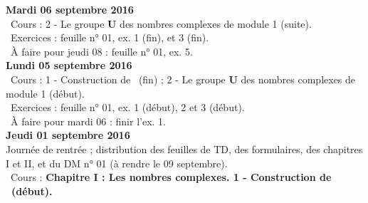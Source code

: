 \documentclass[12pt,a4paper]{article}
\begin{document}
\noindent\textbf{\bf Mardi 06 septembre 2016}\\
\bu\ Cours : 2 - Le groupe \textbf{U} des nombres complexes de 
module 1 (suite).\\
\bu\ Exercices : feuille n° 01, ex. 1 (fin), et 3 (fin).\\
\bu\ À faire pour jeudi 08 : feuille n° 01, ex. 5.\vspace{.4cm}\\

\noindent\textbf{\bf Lundi 05 septembre 2016}\\
\bu\ Cours : 1 - Construction de \C\ (fin) ; 2 - Le groupe \textbf{U} des nombres complexes de 
module 1 (début).\\
\bu\ Exercices : feuille n° 01, ex. 1 (début), 2 et 3 (début).\\
\bu\ À faire pour mardi 06 : finir l'ex. 1.\vspace{.4cm}\\

\noindent\textbf{\bf Jeudi 01 septembre 2016}\\
Journée de rentrée ; distribution des feuilles de TD, des formulaires, des
chapitres I et II, et du DM n° 01 (à rendre le 09 septembre).\\
\bu\ Cours : \bf Chapitre I \rm : Les nombres complexes. 1 - Construction
de \C\ (début).\vspace{.4cm}\\


\label{end}
\end{document}
